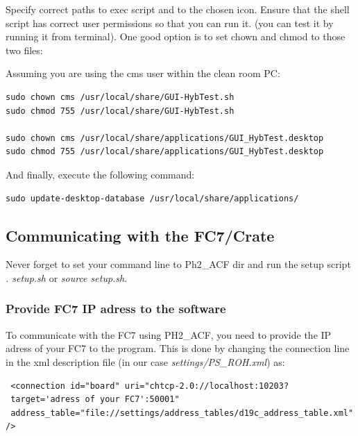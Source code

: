 \documentclass[10pt,a4paper]{article}
\begin{document}
Specify correct paths to exec script and to the chosen icon.
Ensure that the shell script has correct user permissions so that you can run it. (you can test it by running it from terminal). One good option is to set chown and chmod to those two files:

Assuming you are using the cms user within the clean room PC: 

\begin{framed}
\begin{verbatim}
sudo chown cms /usr/local/share/GUI-HybTest.sh
sudo chmod 755 /usr/local/share/GUI-HybTest.sh

sudo chown cms /usr/local/share/applications/GUI_HybTest.desktop
sudo chmod 755 /usr/local/share/applications/GUI_HybTest.desktop
\end{verbatim}
\end{framed}

And finally, execute the following command:
\begin{framed}
\begin{verbatim}
sudo update-desktop-database /usr/local/share/applications/
\end{verbatim}
\end{framed}


\subsection{Communicating with the FC7/Crate}

Never forget to set your command line to Ph2\_ACF dir and run the setup script \emph{. setup.sh} or \emph{source setup.sh}.

\subsubsection{Provide FC7 IP adress to the software}
To communicate with the FC7 using PH2\_ACF, you need to provide the IP adress of your FC7 to the program. This is done by changing the connection line in the xml description file (in our case \emph{settings/PS\_ROH.xml}) as:

\begin{framed}
\begin{verbatim}
 <connection id="board" uri="chtcp-2.0://localhost:10203?
 target='adress of your FC7':50001" 
 address_table="file://settings/address_tables/d19c_address_table.xml" />
\end{verbatim}
\end{framed}
\end{document}
